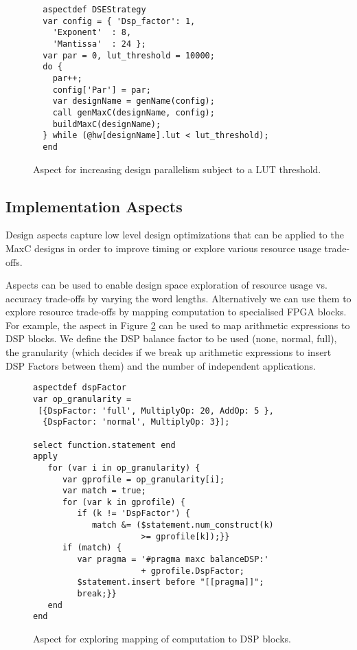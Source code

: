 \lstset{style=lara}
\begin{figure}[!h]
\begin{lstlisting}
  aspectdef DSEStrategy
  var config = { 'Dsp_factor': 1,
    'Exponent'  : 8,
    'Mantissa'  : 24 };
  var par = 0, lut_threshold = 10000;
  do {
    par++;
    config['Par'] = par;
    var designName = genName(config);
    call genMaxC(designName, config);
    buildMaxC(designName);
  } while (@hw[designName].lut < lut_threshold);
  end
\end{lstlisting}
\caption{Aspect for increasing design parallelism subject to a LUT
  threshold.}
\label{fig:aspect-exploration}
\end{figure}

\subsection{Implementation Aspects}

Design aspects capture low level design optimizations that can be
applied to the MaxC designs in order to improve timing or explore
various resource usage trade-offs.

Aspects can be used to enable design space exploration of resource
usage vs. accuracy trade-offs by varying the word
lengths. Alternatively we can use them to explore resource trade-offs
by mapping computation to specialised FPGA blocks. For example, the
aspect in Figure \ref{fig:aspect-DSP} can be used to map arithmetic
expressions to DSP blocks. We define the DSP balance factor to be used
(none, normal, full), the granularity (which decides if we break up
arithmetic expressions to insert DSP Factors between them) and the
number of independent applications.

\lstset{style=lara}
\begin{figure}[!h]
  \centering
  \begin{lstlisting}
aspectdef dspFactor
var op_granularity =
 [{DspFactor: 'full', MultiplyOp: 20, AddOp: 5 },
  {DspFactor: 'normal', MultiplyOp: 3}];

select function.statement end
apply
   for (var i in op_granularity) {
      var gprofile = op_granularity[i];
      var match = true;
      for (var k in gprofile) {
         if (k != 'DspFactor') {
            match &= ($statement.num_construct(k)
                      >= gprofile[k]);}}
      if (match) {
         var pragma = '#pragma maxc balanceDSP:'
                      + gprofile.DspFactor;
         $statement.insert before "[[pragma]]";
         break;}}
   end
end
  \end{lstlisting}
  \caption{Aspect for exploring mapping of computation to DSP blocks.}
  \label{fig:aspect-DSP}
\end{figure}

